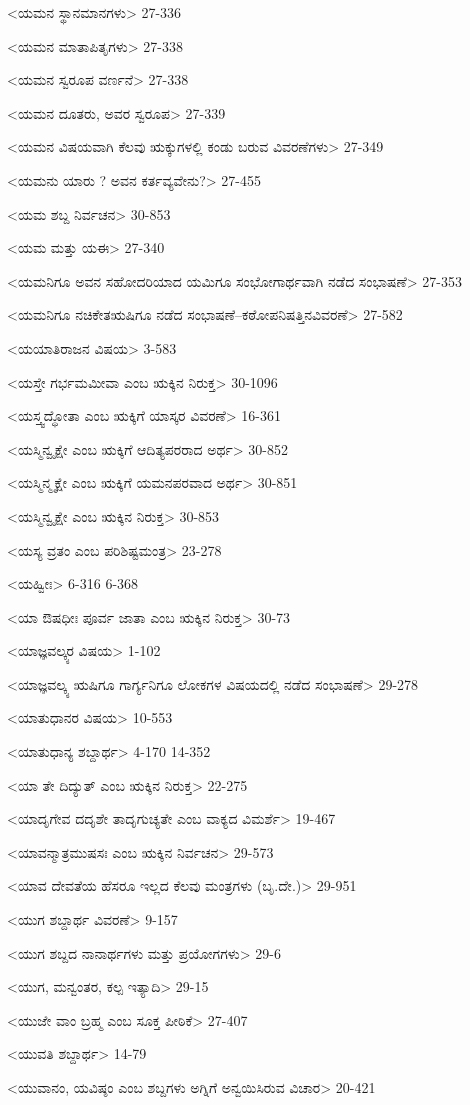 <ಯಮನ ಸ್ಥಾನಮಾನಗಳು>
27-336

<ಯಮನ ಮಾತಾಪಿತೃಗಳು>
27-338

<ಯಮನ ಸ್ವರೂಪ ವರ್ಣನೆ>
27-338

<ಯಮನ ದೂತರು, ಅವರ ಸ್ವರೂಪ>
27-339

<ಯಮನ ವಿಷಯವಾಗಿ ಕೆಲವು ಋಕ್ಕುಗಳಲ್ಲಿ ಕಂಡು ಬರುವ ವಿವರಣೆಗಳು>
27-349

<ಯಮನು ಯಾರು ? ಅವನ ಕರ್ತವ್ಯವೇನು?>
27-455

<ಯಮ ಶಬ್ದ ನಿರ್ವಚನ>
30-853

<ಯಮ ಮತ್ತು ಯಈ>
27-340

<ಯಮನಿಗೂ ಅವನ ಸಹೋದರಿಯಾದ ಯಮಿಗೂ ಸಂಭೋಗಾರ್ಥವಾಗಿ ನಡೆದ ಸಂಭಾಷಣೆ>
27-353

<ಯಮನಿಗೂ ನಚಿಕೇತಋಷಿಗೂ ನಡೆದ ಸಂಭಾಷಣೆ–ಕಠೋಪನಿಷತ್ತಿನವಿವರಣೆ>
27-582

<ಯಯಾತಿರಾಜನ ವಿಷಯ>
3-583

<ಯಸ್ತೇ ಗರ್ಭಮಮೀವಾ ಎಂಬ ಋಕ್ಕಿನ ನಿರುಕ್ತ>
30-1096

<ಯಸ್ತ್ವದ್ಧೋತಾ ಎಂಬ ಋಕ್ಕಿಗೆ ಯಾಸ್ಕರ ವಿವರಣೆ>
16-361

<ಯಸ್ಮಿನ್ವೃಕ್ಷೇ ಎಂಬ ಋಕ್ಕಿಗೆ ಆದಿತ್ಯಪರರಾದ ಅರ್ಥ>
30-852

<ಯಸ್ಮಿನ್ಮೃಕ್ಷೇ ಎಂಬ ಋಕ್ಕಿಗೆ ಯಮನಪರವಾದ ಅರ್ಥ>
30-851

<ಯಸ್ಮಿನ್ವೃಕ್ಷೇ ಎಂಬ ಋಕ್ಕಿನ ನಿರುಕ್ತ>
30-853

<ಯಸ್ಯ ವ್ರತಂ ಎಂಬ ಪರಿಶಿಷ್ಟಮಂತ್ರ>
23-278

<ಯಹ್ವೀಃ>
6-316
6-368

<ಯಾ ಔಷಧೀಃ ಪೂರ್ವ ಜಾತಾ ಎಂಬ ಋಕ್ಕಿನ ನಿರುಕ್ತ>
30-73

<ಯಾಜ್ಞವಲ್ಕ್ಯರ ವಿಷಯ>
1-102

<ಯಾಜ್ಞವಲ್ಕ್ಯ ಋಷಿಗೂ ಗಾರ್ಗ್ಯನಿಗೂ ಲೋಕಗಳ ವಿಷಯದಲ್ಲಿ ನಡೆದ ಸಂಭಾಷಣೆ>
29-278

<ಯಾತುಧಾನರ ವಿಷಯ>
10-553

<ಯಾತುಧಾನ್ಯ ಶಬ್ದಾರ್ಥ>
4-170 
14-352

<ಯಾ ತೇ ದಿದ್ಯುತ್‍ ಎಂಬ ಋಕ್ಕಿನ ನಿರುಕ್ತ>
22-275

<ಯಾದೃಗೇವ ದದೃಶೇ ತಾದೃಗುಚ್ಯತೇ ಎಂಬ ವಾಕ್ಯದ ವಿಮರ್ಶೆ>
19-467

<ಯಾವನ್ಮಾತ್ರಮುಷಸಃ ಎಂಬ ಋಕ್ಕಿನ ನಿರ್ವಚನ>
29-573

<ಯಾವ ದೇವತೆಯ ಹೆಸರೂ ಇಲ್ಲದ ಕೆಲವು ಮಂತ್ರಗಳು (ಬೃ.ದೇ.)>
29-951

<ಯುಗ ಶಬ್ದಾರ್ಥ ವಿವರಣೆ>
9-157

<ಯುಗ ಶಬ್ದದ ನಾನಾರ್ಥಗಳು ಮತ್ತು ಪ್ರಯೋಗಗಳು>
29-6

<ಯುಗ, ಮನ್ವಂತರ, ಕಲ್ಪ ಇತ್ಯಾದಿ>
29-15

<ಯುಜೇ ವಾಂ ಬ್ರಹ್ಮ ಎಂಬ ಸೂಕ್ತ ಪೀಠಿಕೆ>
27-407

<ಯುವತಿ ಶಬ್ದಾರ್ಥ>
14-79

<ಯುವಾನಂ, ಯವಿಷ್ಠಂ ಎಂಬ ಶಬ್ದಗಳು ಅಗ್ನಿಗೆ ಅನ್ವಯಿಸಿರುವ ವಿಚಾರ>
20-421

